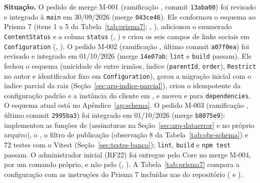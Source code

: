\textbf{Situação.} O pedido de merge M-001 (ramificação , commit \texttt{13aba00}) foi revisado e integrado à \texttt{main} em 30/09/2026 (merge \texttt{043ce46}). Ele conformou o esquema ao Prisma 7 (itens 1 a 5 da Tabela~\ref{tab:prisma7}; , ), adicionou o enumerado \texttt{ContentStatus} e a coluna \texttt{status} (, ) e criou os seis campos de links sociais em \texttt{Configuration} (, ). O pedido M-002 (ramificação , último commit \texttt{a07f0ea}) foi revisado e integrado em 01/10/2026 (merge \texttt{14e07ab}; \texttt{lint} e \texttt{build} passam). Ele fechou o esquema (unicidade de  entre irmãos, índice (\texttt{parentId}, \texttt{order}), \texttt{Restrict} no autor e identificador fixo em \texttt{Configuration}), gerou a migração inicial com o índice parcial da raiz (Seção~\ref{sec:arq-indice-parcial}), criou o  idempotente da configuração padrão e a instância do cliente em , e moveu  e  para \texttt{dependencies}. O esquema atual está no Apêndice~\ref{ap:schema}. O pedido M-003 (ramificação , último commit \texttt{2995ba3}) foi integrado em 01/10/2026 (merge \texttt{b8075e9}): implementou as funções de  (assinaturas na Seção~\ref{sec:arq-dataerror} e no próprio arquivo), o , o filtro de publicação (observação 8 da Tabela~\ref{tab:obs-schema}) e 72 testes com o Vitest (Seção~\ref{sec:testes-banco}); \texttt{lint}, \texttt{build} e \texttt{npm test} passam. O administrador inicial (RF22) foi entregue pelo Core no merge M-004, por um comando próprio, e não pelo  (, ). A Tabela~\ref{tab:prisma7} compara a configuração com as instruções do Prisma 7 incluídas nas  do repositório ( e ).

